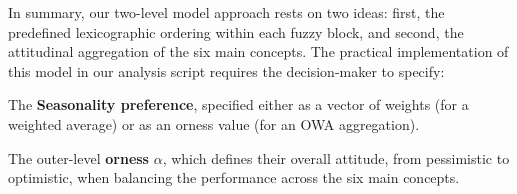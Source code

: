 In summary, our two-level model approach rests on two ideas: first, the predefined lexicographic ordering within each fuzzy block, and second, the attitudinal aggregation of the six main concepts. The practical implementation of this model in our analysis script requires the decision-maker to specify: %
\begin{romanenum}
    \item The \textbf{Seasonality preference}, specified either as a vector of weights (for a weighted average) or as an orness value (for an OWA aggregation).
    \item The outer-level \textbf{orness} $\alpha$, which defines their overall attitude, from pessimistic to optimistic, when balancing the performance across the six main concepts.
\end{romanenum}